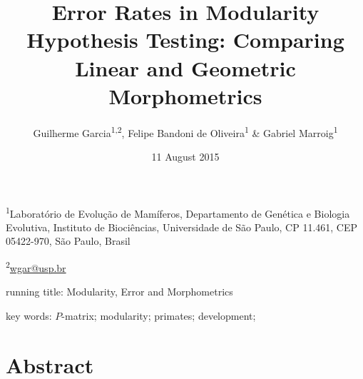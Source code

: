 \documentclass[12pt,]{article}
\title{Error Rates in Modularity Hypothesis Testing: Comparing Linear and
Geometric Morphometrics}
\author{Guilherme Garcia\textsuperscript{1,2}, Felipe Bandoni de
Oliveira\textsuperscript{1} \& Gabriel Marroig\textsuperscript{1}}
\date{11 August 2015}
\begin{document}
\maketitle


\linenumbers
\modulolinenumbers[2]

\onehalfspacing

\textsuperscript{1}Laboratório de Evolução de Mamíferos, Departamento de
Genética e Biologia Evolutiva, Instituto de Biociências, Universidade de
São Paulo, CP 11.461, CEP 05422-970, São Paulo, Brasil

\textsuperscript{2}\href{mailto:wgar@usp.br}{wgar@usp.br}

running title: Modularity, Error and Morphometrics

key words: $P$-matrix; modularity; primates; development;

\section{Abstract}\label{abstract}
\end{document}
